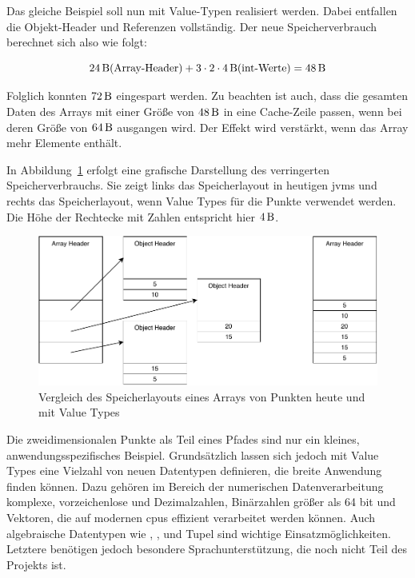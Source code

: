 Das gleiche Beispiel soll nun mit Value-Typen realisiert werden.
Dabei entfallen die Objekt-Header und Referenzen vollständig.
Der neue Speicherverbrauch berechnet sich also wie folgt:

\[ \SI{24}{\byte} \text{(Array-Header)} + 3 \cdot 2 \cdot \SI{4}{\byte} \text{(int-Werte)} = \SI{48}{\byte} \]

Folglich konnten $\SI{72}{\byte}$ eingespart werden.
Zu beachten ist auch, dass die gesamten Daten des Arrays mit einer Größe von $\SI{48}{\byte}$ in eine Cache-Zeile passen, wenn bei deren Größe von $\SI{64}{\byte}$ ausgangen wird.
Der Effekt wird verstärkt, wenn das Array mehr Elemente enthält.

In Abbildung~\ref{fig:memory-usage} erfolgt eine grafische Darstellung des verringerten Speicherverbrauchs.
Sie zeigt links das Speicherlayout in heutigen \acp{jvm} und rechts das Speicherlayout, wenn Value Types für die Punkte verwendet werden.
Die Höhe der Rechtecke mit Zahlen entspricht hier $\SI{4}{\byte}$.

\begin{figure}
    \centering
    \includegraphics{img/memory-usage.pdf}
    \caption{Vergleich des Speicherlayouts eines Arrays von Punkten heute und mit Value Types}
    \label{fig:memory-usage}
\end{figure}

Die zweidimensionalen Punkte als Teil eines Pfades sind nur ein kleines, anwendungsspezifisches Beispiel.
Grundsätzlich lassen sich jedoch mit Value Types eine Vielzahl von neuen Datentypen definieren, die breite Anwendung finden können.
Dazu gehören im Bereich der numerischen Datenverarbeitung komplexe, vorzeichenlose und Dezimalzahlen, Binärzahlen größer als 64 bit und Vektoren, die auf modernen \acp{cpu} effizient verarbeitet werden können.
Auch algebraische Datentypen wie , ,  und Tupel sind wichtige Einsatzmöglichkeiten.
Letztere benötigen jedoch besondere Sprachunterstützung, die noch nicht Teil des Projekts ist.

